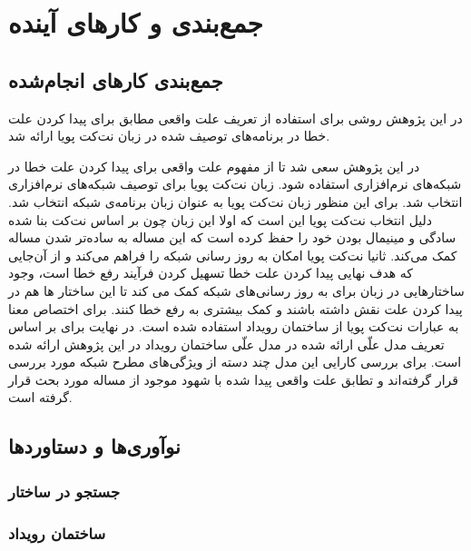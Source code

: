 \chapter{جمع‌بندی و کار‌های آینده}
\section{جمع‌بندی کار‌های انجام‌شده}
 در این پژوهش روشی برای استفاده از تعریف علت واقعی مطابق
\cite{hp}
برای پیدا کردن علت خطا در برنامه‌های توصیف شده در زبان نت‌کت پویا ارائه شد.

در این پژوهش سعی شد تا از مفهوم علت واقعی برای پیدا کردن علت خطا در شبکه‌های نرم‌افزاری استفاده شود.
زبان نت‌کت پویا برای توصیف شبکه‌های نرم‌افزاری انتخاب شد.
برای این منظور زبان نت‌کت پویا به عنوان زبان برنامه‌ی‌ شبکه‌ انتخاب شد.
دلیل انتخاب نت‌کت پویا این است که اولا این زبان چون بر اساس نت‌کت بنا شده سادگی و مینیمال بودن خود را حفظ کرده است که این مساله به ساده‌تر شدن مساله کمک می‌کند.
ثانیا نت‌کت پویا امکان به روز‌ رسانی شبکه را فراهم می‌کند و از آن‌جایی که هدف نهایی پیدا کردن علت خطا تسهیل کردن فرآیند رفع خطا است، وجود ساختارهایی در زبان برای به روز رسانی‌های شبکه کمک می کند تا این ساختار ها هم در پیدا کردن علت نقش داشته باشند و کمک بیشتری به رفع خطا کنند.
 برای اختصاص معنا به عبارات نت‌کت پویا از ساختمان رویداد استفاده شده است.
 در نهایت برای بر اساس تعریف مدل علّی ارائه شده در
 \cite{hp}
 مدل علّی ساختمان رویداد در این پژوهش ارائه شده است.
 برای بررسی کارایی این مدل چند دسته از ویژگی‌های مطرح شبکه مورد بررسی قرار گرفته‌اند و تطابق علت واقعی پیدا شده با شهود موجود از مساله مورد بحث قرار گرفته است.

 \section{نوآوری‌ها و دستاورد‌ها}

 \subsection{جستجو در ساختار}
 \subsection{ساختمان رویداد}
